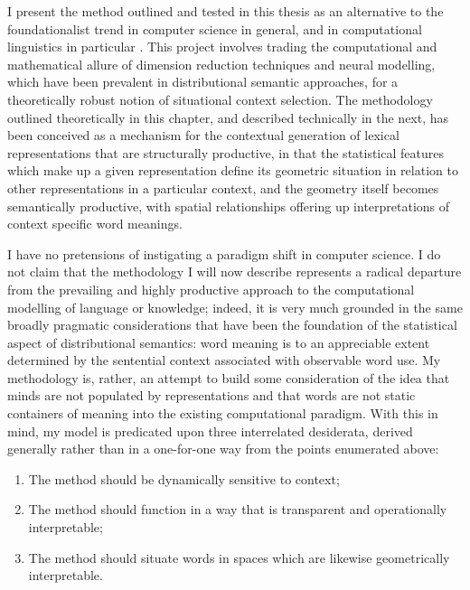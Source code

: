 I present the method outlined and tested in this thesis as an alternative to the foundationalist trend in computer science in general, and in computational linguistics in particular \citep[see][for a robust philosophical criticism of the idea that concepts are stable]{Rorty1979}.  This project involves trading the computational and mathematical allure of dimension reduction techniques and neural modelling, which have been prevalent in distributional semantic approaches, for a theoretically robust notion of situational context selection.  The methodology outlined theoretically in this chapter, and described technically in the next, has been conceived as a mechanism for the contextual generation of lexical representations that are structurally productive, in that the statistical features which make up a given representation define its geometric situation in relation to other representations in a particular context, and the geometry itself becomes semantically productive, with spatial relationships offering up interpretations of context specific word meanings.

I have no pretensions of instigating a paradigm shift in computer science.  I do not claim that the methodology I will now describe represents a radical departure from the prevailing and highly productive approach to the computational modelling of language or knowledge; indeed, it is very much grounded in the same broadly pragmatic considerations that have been the foundation of the statistical aspect of distributional semantics: word meaning is to an appreciable extent determined by the sentential context associated with observable word use.  My methodology is, rather, an attempt to build some consideration of the idea that minds are not populated by representations and that words are not static containers of meaning into the existing computational paradigm.  With this in mind, my model is predicated upon three interrelated desiderata, derived generally rather than in a one-for-one way from the points enumerated above:

\begin{enumerate}
\item The method should be dynamically sensitive to context;
\item The method should function in a way that is transparent and operationally interpretable;
\item The method should situate words in spaces which are likewise geometrically interpretable.
\end{enumerate}

